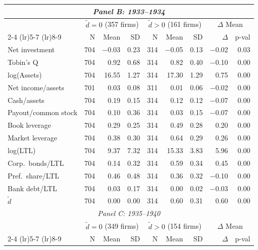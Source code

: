 \begin{table}[p]
\begin{threeparttable}
\begin{tabular}{l rrr rrr rr}
            \midrule
            \multicolumn{9}{c}{\textit{Panel B: 1933--1934}} \\
            \midrule
             & \multicolumn{3}{c}{$\tilde{d} = 0$ (357 firms)} & \multicolumn{3}{c}{$\tilde{d} > 0$ (161 firms)} & \multicolumn{2}{c}{$\Delta$ Mean} \\
            \cmidrule(lr){2-4} \cmidrule(lr){5-7} \cmidrule(lr){8-9}
             & N & Mean & SD & N & Mean & SD & $\Delta$ & p-val \\
            Net investment & 704 & $-$0.03 & 0.23 & 314 & $-$0.05 & 0.13 & $-$0.02 & 0.03 \\
            Tobin's Q & 704 & 0.92 & 0.68 & 314 & 0.82 & 0.40 & $-$0.10 & 0.00 \\
            log(Assets) & 704 & 16.55 & 1.27 & 314 & 17.30 & 1.29 & 0.75 & 0.00 \\
            Net income/assets & 701 & 0.03 & 0.08 & 311 & 0.01 & 0.06 & $-$0.02 & 0.00 \\
            Cash/assets & 704 & 0.19 & 0.15 & 314 & 0.12 & 0.12 & $-$0.07 & 0.00 \\
            Payout/common stock & 704 & 0.10 & 0.36 & 314 & 0.03 & 0.15 & $-$0.07 & 0.00 \\
            Book leverage & 704 & 0.29 & 0.25 & 314 & 0.49 & 0.28 & 0.20 & 0.00 \\
            Market leverage & 704 & 0.38 & 0.30 & 314 & 0.64 & 0.29 & 0.26 & 0.00 \\
            log(LTL) & 704 & 9.37 & 7.32 & 314 & 15.33 & 3.83 & 5.96 & 0.00 \\
            Corp.\ bonds/LTL & 704 & 0.14 & 0.32 & 314 & 0.59 & 0.34 & 0.45 & 0.00 \\
            Pref.\ share/LTL & 704 & 0.46 & 0.48 & 314 & 0.36 & 0.32 & $-$0.10 & 0.00 \\
            Bank debt/LTL & 704 & 0.03 & 0.17 & 314 & 0.00 & 0.02 & $-$0.03 & 0.00 \\
            \ensuremath{\tilde{d}} & 704 & 0.00 & 0.00 & 314 & 0.60 & 0.31 & 0.60 & 0.00 \\
            \midrule
            \multicolumn{9}{c}{\textit{Panel C: 1935--1940}} \\
            \midrule
             & \multicolumn{3}{c}{$\tilde{d} = 0$ (349 firms)} & \multicolumn{3}{c}{$\tilde{d} > 0$ (154 firms)} & \multicolumn{2}{c}{$\Delta$ Mean} \\
            \cmidrule(lr){2-4} \cmidrule(lr){5-7} \cmidrule(lr){8-9}
             & N & Mean & SD & N & Mean & SD & $\Delta$ & p-val \\

\end{tabular}
\end{threeparttable}
\end{table}
